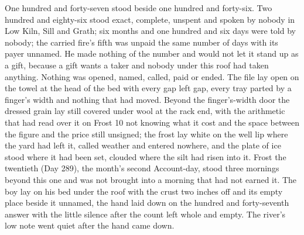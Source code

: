 One hundred and forty-seven stood beside one hundred and forty-six. Two hundred and eighty-six stood exact, complete, unspent and spoken by nobody in Low Kiln, Sill and Grath; six months and one hundred and six days were told by nobody; the carried fire's fifth was unpaid the same number of days with its payer unnamed. He made nothing of the number and would not let it stand up as a gift, because a gift wants a taker and nobody under this roof had taken anything. Nothing was opened, named, called, paid or ended. The file lay open on the towel at the head of the bed with every gap left gap, every tray parted by a finger's width and nothing that had moved. Beyond the finger's-width door the dressed grain lay still covered under wool at the rack end, with the arithmetic that had read over it on Frost 10 not knowing what it cost and the space between the figure and the price still unsigned; the frost lay white on the well lip where the yard had left it, called weather and entered nowhere, and the plate of ice stood where it had been set, clouded where the silt had risen into it. Frost the twentieth (Day 289), the month's second Account-day, stood three mornings beyond this one and was not brought into a morning that had not earned it. The boy lay on his bed under the roof with the crust two inches off and its empty place beside it unnamed, the hand laid down on the hundred and forty-seventh answer with the little silence after the count left whole and empty. The river's low note went quiet after the hand came down.
